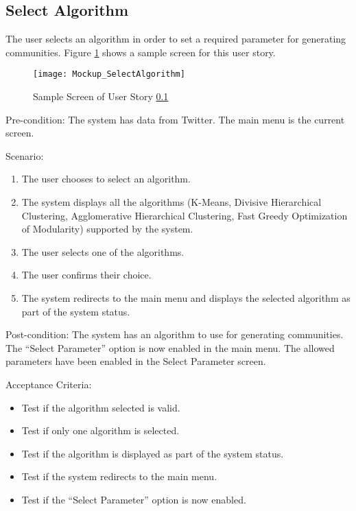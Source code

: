 \subsection{Select Algorithm}
\label{us:selectalgo}


The user selects an algorithm in order to set a required parameter for generating communities. Figure \ref{fig:selectalgo} shows a sample screen for this user story.

\begin{figure}[h]
	\centering
	\texttt{[image: Mockup\_SelectAlgorithm]}
	\caption{Sample Screen of User Story \ref{us:selectalgo}}
	\label{fig:selectalgo}	
\end{figure}

Pre-condition: The system has data from Twitter. The main menu is the current screen.


Scenario:
\begin{enumerate}
	\item The user chooses to select an algorithm.
	\item The system displays all the algorithms (K-Means, Divisive Hierarchical Clustering, Agglomerative Hierarchical Clustering, Fast Greedy Optimization of Modularity) supported by the system.
	\item The user selects one of the algorithms.
	\item The user confirms their choice.
	\item The system redirects to the main menu and displays the selected algorithm as part of the system status.
\end{enumerate}


Post-condition: The system has an algorithm to use for generating communities. The ``Select Parameter'' option
is now enabled in the main menu. The allowed parameters have been enabled in the Select Parameter screen.


Acceptance Criteria:
\begin{itemize}
	\item Test if the algorithm selected is valid.
	\item Test if only one algorithm is selected.
	\item Test if the algorithm is displayed as part of the system status.
	\item Test if the system redirects to the main menu.
	\item Test if the ``Select Parameter'' option is now enabled.
\end{itemize}


